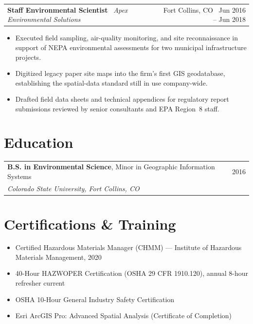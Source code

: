 \documentclass[10pt,letterpaper]{article}
\makeatletter
\newcommand{\role}[3]{%
  \begin{tabularx}{\linewidth}{@{}X r@{}}
    \textbf{\color{slate}#1} \textbar\ \textit{\color{stone}#2} & {\small\color{stone}#3} \\
  \end{tabularx}%
  \vspace{-4pt}
}
\makeatother
\begin{document}
\role{Staff Environmental Scientist}{Apex Environmental Solutions}{Fort Collins, CO \textbar\ Jun 2016 -- Jun 2018}
\begin{itemize}
  \item Executed field sampling, air-quality monitoring, and site reconnaissance in support
        of NEPA environmental assessments for two municipal infrastructure projects.
  \item Digitized legacy paper site maps into the firm's first GIS geodatabase, establishing
        the spatial-data standard still in use company-wide.
  \item Drafted field data sheets and technical appendices for regulatory report submissions
        reviewed by senior consultants and EPA Region~8 staff.
\end{itemize}

\normalsize
\section{Education}
\begin{tabularx}{\linewidth}{@{}X r@{}}
  \textbf{\color{slate}B.S. in Environmental Science}, Minor in Geographic Information Systems & {\small\color{stone}2016} \\
  \textit{\color{stone}Colorado State University, Fort Collins, CO} & \\
\end{tabularx}

\section{Certifications \& Training}
\small
\begin{itemize}
  \item Certified Hazardous Materials Manager (CHMM) --- Institute of Hazardous Materials Management, 2020
  \item 40-Hour HAZWOPER Certification (OSHA 29 CFR 1910.120), annual 8-hour refresher current
  \item OSHA 10-Hour General Industry Safety Certification
  \item Esri ArcGIS Pro: Advanced Spatial Analysis (Certificate of Completion)
\end{itemize}
\end{document}
